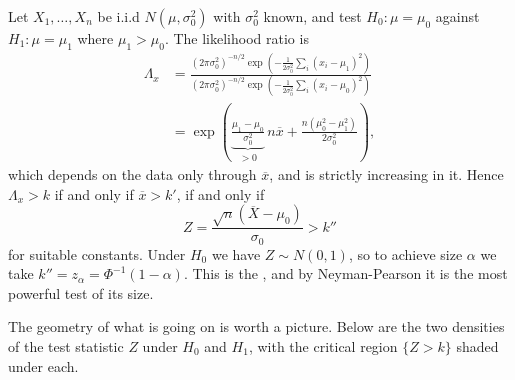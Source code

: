 \begin{example}
  Let $X_1, \dots, X_n$ be i.i.d $N(\mu, \sigma_0^2)$ with $\sigma_0^2$ known, and test $H_0 : \mu = \mu_0$ against $H_1 : \mu = \mu_1$ where $\mu_1 > \mu_0$. The likelihood ratio is
  \begin{align*}
    \Lambda_x &= \frac{(2\pi\sigma_0^2)^{-n/2}\exp\left(-\frac{1}{2\sigma_0^2}\sum_i(x_i - \mu_1)^2\right)}{(2\pi\sigma_0^2)^{-n/2}\exp\left(-\frac{1}{2\sigma_0^2}\sum_i(x_i - \mu_0)^2\right)}\\
    &= \exp\left(\underbrace{\frac{\mu_1 - \mu_0}{\sigma_0^2}}_{> 0}\, n\overline{x} + \frac{n(\mu_0^2 - \mu_1^2)}{2\sigma_0^2}\right),
  \end{align*}
  which depends on the data only through $\overline{x}$, and is strictly increasing in it. Hence $\Lambda_x > k$ if and only if $\overline{x} > k'$, if and only if
  $$
  Z = \frac{\sqrt{n}\left(\overline{X} - \mu_0\right)}{\sigma_0} > k''
  $$
  for suitable constants. Under $H_0$ we have $Z \sim N(0,1)$, so to achieve size $\alpha$ we take $k'' = z_\alpha = \Phi^{-1}(1-\alpha)$. This is the , and by Neyman-Pearson it is the most powerful test of its size.
\end{example}

The geometry of what is going on is worth a picture. Below are the two densities of the test statistic $Z$ under $H_0$ and $H_1$, with the critical region $\{Z > k\}$ shaded under each.

